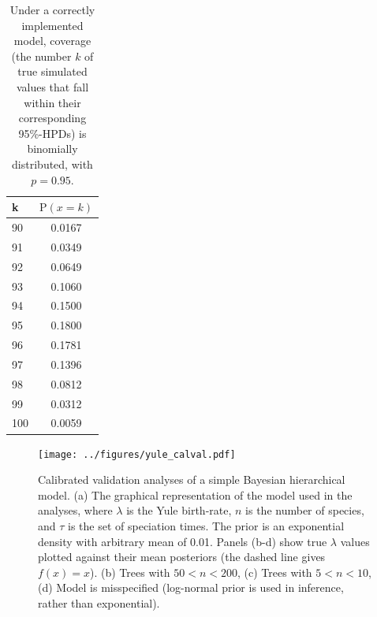 \documentclass[oneside]{article}
\begin{document}
\begin{table}
\begin{center}
\begin{tabular}{lc}
\hline
k & $\text{P}(x=k)$ \\ %
\hline
90 & 0.0167 \\ %
91 & 0.0349 \\ %
92 & 0.0649 \\ %
93 & 0.1060 \\ %
94 & 0.1500 \\ %
95 & 0.1800 \\ %
96 & 0.1781 \\ %
97 & 0.1396 \\ %
98 & 0.0812 \\ %
99 & 0.0312 \\ %
100 & 0.0059 \\ %
\hline
\end{tabular}
\end{center}
\caption{Under a correctly implemented model, coverage (the number $k$
  of true simulated values that fall within their corresponding 95\%-HPDs) is binomially
  distributed, with $p=0.95$. 
\label{tab:coverage}}
\end{table}

\begin{figure}
  \texttt{[image: ../figures/yule\_calval.pdf]}
  \caption{Calibrated validation analyses of a simple Bayesian
    hierarchical model. (a) The graphical representation of the model used in
    the analyses, where $\lambda$ is the Yule birth-rate, $n$ is the
    number of species, and $\tau$ is the set of speciation times. The
    prior is an exponential density with arbitrary mean of 0.01. Panels (b-d)
    show true $\lambda$ values plotted against their mean posteriors
    (the dashed line gives $f(x) = x$). (b) Trees
    with $50<n<200$, (c) Trees with $5<n<10$, (d) Model is
    misspecified (log-normal prior is used in inference, rather than exponential).
  }
  \label{fig:yulecalval}
\end{figure}
\end{document}
